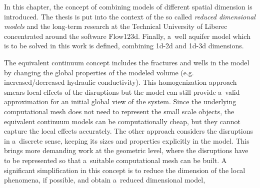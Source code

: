 
In this chapter, the concept of combining models of different spatial dimension is introduced.
The thesis is put into the context of the so called \emph{reduced dimensional models} and
the long-term research at the Technical University of Liberec concentrated around the software Flow123d.
Finally, a~well aquifer model which is to be solved in this work is defined, combining 1d-2d and 1d-3d dimensions.


The equivalent continuum concept includes the fractures and wells in the model by changing the global properties of the modeled volume
(e.g. increased/decreased hydraulic conductivity).
This homogenization approach smears local effects of the disruptions but the model can still provide a~valid approximation for an initial global view of the system.
Since the underlying computational mesh does not need to represent the small scale objects, the equivalent continuum models can be computationally cheap,
but they cannot capture the local effects accurately.
The other approach considers the disruptions in a~discrete sense, keeping its sizes and properties explicitly in the model.
This brings more demanding work at the geometric level, where the disruptions have to be represented so that a~suitable computational mesh can be built.
A significant simplification in this concept is to reduce the dimension of the local phenomena, if possible, and obtain a~reduced dimensional model,

